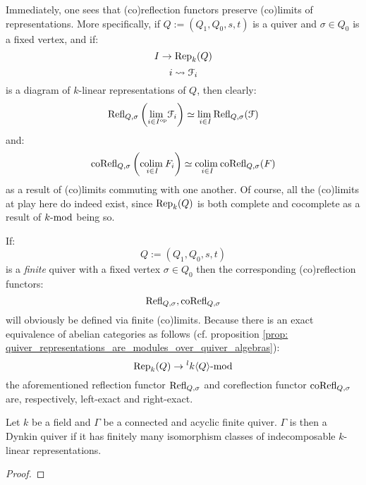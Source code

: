             \begin{remark} \label{remark: categorical_properties_of_(co)reflection_functors}
                Immediately, one sees that (co)reflection functors preserve (co)limits of representations. More specifically, if $Q := (Q_1, Q_0, s, t)$ is a quiver and $\sigma \in Q_0$ is a fixed vertex, and if:
                    $$I \to \Rep_k(Q)$$
                    $$i \mapsto \calF_i$$
                is a diagram of $k$-linear representations of $Q$, then clearly:
                    $$\Refl_{Q, \sigma}\left( \underset{i \in I^{\op}}{\lim} \calF_i \right) \cong \underset{i \in I}{\lim} \Refl_{Q, \sigma}(\calF)$$
                and:
                    $$\co\Refl_{Q, \sigma}\left( \underset{i \in I}{\colim} F_i \right) \cong \underset{i \in I}{\colim} \co\Refl_{Q, \sigma}(F)$$
                as a result of (co)limits commuting with one another. Of course, all the (co)limits at play here do indeed exist, since $\Rep_k(Q)$ is both complete and cocomplete as a result of $k\mod$ being so.
            \end{remark}
            \begin{remark} \label{remark: (co)reflection_functors_of_finite_quivers_are_exact}
                If:
                    $$Q := (Q_1, Q_0, s, t)$$
                is a \textit{finite} quiver with a fixed vertex $\sigma \in Q_0$ then the corresponding (co)reflection functors:
                    $$\Refl_{Q, \sigma}, \co\Refl_{Q, \sigma}$$
                will obviously be defined via finite (co)limits. Because there is an exact equivalence of abelian categories as follows (cf. proposition \ref{prop: quiver_representations_are_modules_over_quiver_algebras}):
                    $$\Rep_k(Q) \to {}^lk\<Q\>\mod$$
                the aforementioned reflection functor $\Refl_{Q, \sigma}$ and coreflection functor $\co\Refl_{Q, \sigma}$ are, respectively, left-exact and right-exact.
            \end{remark}
            
            \begin{theorem} \label{theorem: gabriel_theorem_representation_finite_implies_dynkin}
                Let $k$ be a field and $\Gamma$ be a connected and acyclic finite quiver. $\Gamma$ is then a Dynkin quiver if it has finitely many isomorphism classes of indecomposable $k$-linear representations.
            \end{theorem}
                \begin{proof}
                    
                \end{proof}
                
